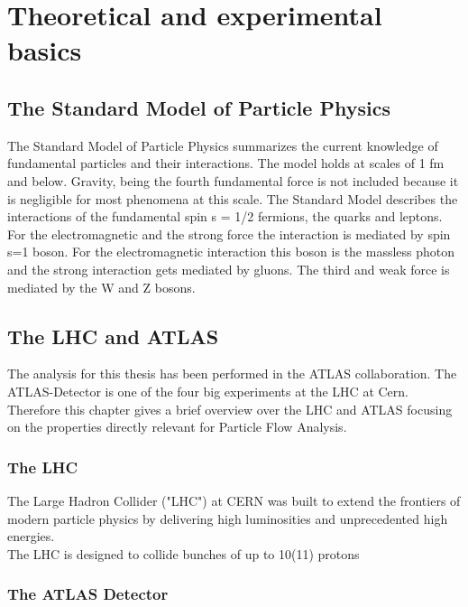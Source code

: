 \chapter{Theoretical and experimental basics}
\label{theory}

\section{The Standard Model of Particle Physics}

The Standard Model of Particle Physics summarizes the current knowledge of fundamental particles and their interactions. The model holds at scales of 1 fm and below. Gravity, being the fourth fundamental force is not included because it is negligible for most phenomena at this scale.
The Standard Model describes the interactions of the fundamental spin  s = 1/2 fermions, the quarks and leptons. For the electromagnetic and the strong force the interaction is mediated by spin s=1 boson. For the electromagnetic interaction this boson is the massless photon and the strong interaction gets mediated by gluons.  The third and weak force is mediated by the W and Z bosons.~\cite{griffith08}





\section{The LHC and ATLAS}

The analysis for this thesis has been performed in the ATLAS collaboration. The ATLAS-Detector is one of the four big experiments at the LHC at Cern. Therefore this chapter gives a brief overview over the LHC and ATLAS focusing on the properties directly relevant for Particle Flow Analysis.

\subsection{The LHC}

The Large Hadron Collider ("LHC") at CERN was built to extend the frontiers of modern particle physics by delivering high luminosities and unprecedented high energies.\\

The LHC is designed to collide bunches of up to 10(11) protons

\subsection{The ATLAS Detector}


